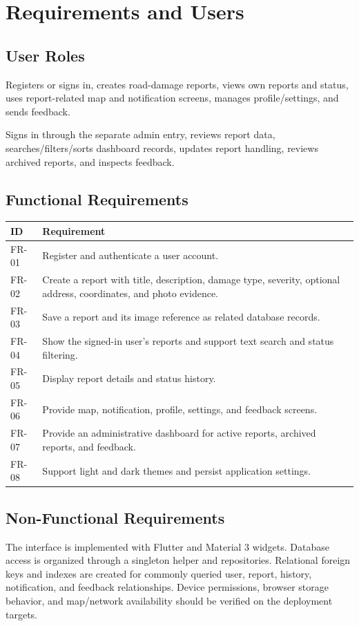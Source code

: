 \documentclass[12pt,a4paper]{report}
\begin{document}
\chapter{Requirements and Users}
\section{User Roles}
\begin{description}[style=nextline,leftmargin=0pt]
  \item[Community user] Registers or signs in, creates road-damage reports, views own reports and status, uses report-related map and notification screens, manages profile/settings, and sends feedback.
  \item[Administrator] Signs in through the separate admin entry, reviews report data, searches/filters/sorts dashboard records, updates report handling, reviews archived reports, and inspects feedback.
\end{description}

\section{Functional Requirements}
\begin{longtable}{p{}p{}}
\toprule
\textbf{ID} & \textbf{Requirement} \\
\midrule
FR-01 & Register and authenticate a user account. \\
FR-02 & Create a report with title, description, damage type, severity, optional address, coordinates, and photo evidence. \\
FR-03 & Save a report and its image reference as related database records. \\
FR-04 & Show the signed-in user's reports and support text search and status filtering. \\
FR-05 & Display report details and status history. \\
FR-06 & Provide map, notification, profile, settings, and feedback screens. \\
FR-07 & Provide an administrative dashboard for active reports, archived reports, and feedback. \\
FR-08 & Support light and dark themes and persist application settings. \\
\bottomrule
\end{longtable}

\section{Non-Functional Requirements}
The interface is implemented with Flutter and Material 3 widgets. Database access is organized through a singleton helper and repositories. Relational foreign keys and indexes are created for commonly queried user, report, history, notification, and feedback relationships. Device permissions, browser storage behavior, and map/network availability should be verified on the deployment targets.
\end{document}
